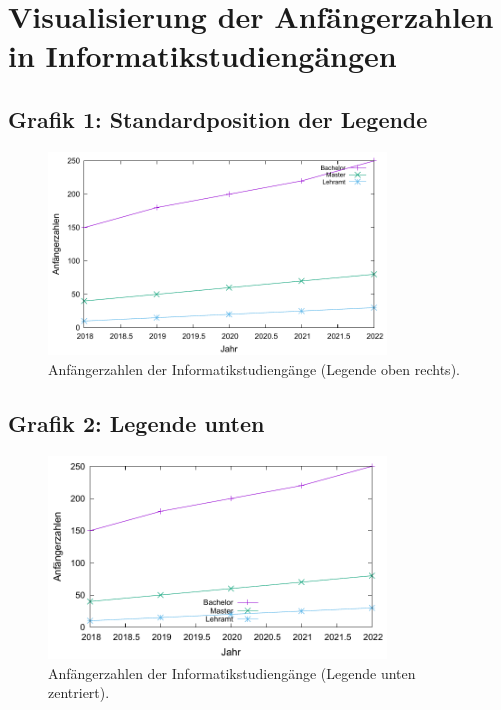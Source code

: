 \documentclass[a4paper,12pt]{article}
\begin{document}
\section*{Visualisierung der Anfängerzahlen in Informatikstudiengängen}

\subsection*{Grafik 1: Standardposition der Legende}
\begin{figure}[h!]
    \centering
    \includegraphics[width=0.8\textwidth]{plot1.pdf}
    \caption{Anfängerzahlen der Informatikstudiengänge (Legende oben rechts).}
\end{figure}

\subsection*{Grafik 2: Legende unten}
\begin{figure}[h!]
    \centering
    \includegraphics[width=0.8\textwidth]{plot2.pdf}
    \caption{Anfängerzahlen der Informatikstudiengänge (Legende unten zentriert).}
\end{figure}
\end{document}

